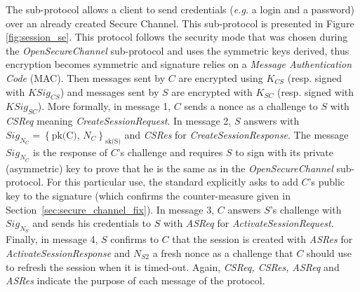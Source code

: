 \newcommand{\csreq}{CSReq}
\newcommand{\csres}{CSRes}
\newcommand{\asreq}{ASReq}
\newcommand{\asres}{ASRes}

The  sub-protocol allows a client to send
credentials (\emph{e.g.} a login and a password) over an already
created Secure Channel.  This sub-protocol is presented in Figure
\ref{fig:session_se}.  This protocol follows the security mode that
was chosen during the {\em OpenSecureChannel} sub-protocol and uses
the symmetric keys derived, thus encryption becomes symmetric and
signature relies on a \emph{Message Authentication Code} (MAC).  Then
messages sent by $C$ are encrypted using $K_{CS}$ (resp. signed with
$KSig_{CS}$) and messages sent by $S$ are encrypted with $K_{SC}$
(resp. signed with $KSig_{SC}$).  More formally, in message 1, $C$
sends a nonce as a challenge to $S$ with {\em CSReq} meaning {\em
  CreateSessionRequest}.  In message 2, $S$ answers with $Sig_{N_{C}}
= \left\{\mbox{pk(C), $N_{C}$}\right\}_{\mbox{sk(S)}}$ and {\em CSRes}
for {\em CreateSessionResponse}. The message $Sig_{N_{C}}$ is the
response of $C$'s challenge and requires $S$ to sign with its private
(asymmetric) key to prove that he is the same as in the {\em
  OpenSecureChannel} sub-protocol.  For this particular use, the
\opcua standard explicitly asks to add $C$'s public key to the
signature (which confirms the counter-measure given in
Section~\ref{sec:secure_channel_fix}).  In message 3, $C$ answers
$S$'s challenge with $Sig_{N_{S}}$ and sends his credentials to $S$
with {\em ASReq} for {\em ActivateSessionRequest}.  Finally, in message
4, $S$ confirms to $C$ that the session is created with {\em ASRes}
for {\em ActivateSessionResponse} and $N_{S2}$ a fresh nonce as a
challenge that $C$ should use to refresh the session when it is
timed-out.  Again, {\em CSReq, CSRes, ASReq} and {\em ASRes} indicate
the purpose of each message of the protocol.

